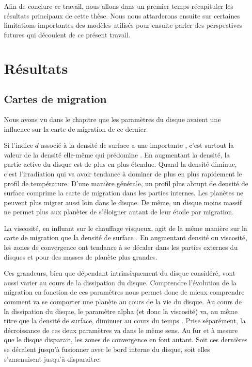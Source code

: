 Afin de conclure ce travail, nous allons dans un premier temps récapituler les résultats principaux de cette thèse. Nous nous attarderons ensuite sur certaines limitations importantes des modèles utilisés pour ensuite parler des perspectives futures qui découlent de ce présent travail. 

\section{Résultats}
\subsection{Cartes de migration}
Nous avons vu dans le chapitre  que les paramètres du disque avaient une influence sur la carte de migration de ce dernier. 

Si l'indice $d$ associé à la densité de surface a une importante , c'est surtout la valeur de la densité
elle-même qui prédomine . En augmentant la densité, la partie active du disque est de plus en plus étendue.
Quand la densité diminue, c'est l'irradiation qui va avoir tendance à dominer de plus en plus rapidement le profil de
température. D'une manière générale, un profil plus abrupt de densité de surface comprime la carte de migration dans les parties
internes. Les planètes ne peuvent plus migrer aussi loin dans le disque. De même, un disque moins massif ne permet plus aux
planètes de s'éloigner autant de leur étoile par migration. 

La viscosité, en influant sur le chauffage visqueux, agit de la même manière sur la carte de migration que la densité de surface
. En augmentant densité ou viscosité, les zones de convergence ont tendance à se décaler dans les
parties externes du disques et pour des masses de planète plus grandes. 

Ces grandeurs, bien que dépendant intrinsèquement du disque considéré, vont aussi varier au cours de la dissipation du disque.
Comprendre l'évolution de la migration en fonction de ces paramètres nous permet donc de mieux comprendre comment va se
comporter une planète au cours de la vie du disque. Au cours de la dissipation du disque, le paramètre alpha (et donc la
viscosité) va, au même titre que la densité de surface, diminuer au cours du temps \citep[Fig. 16]{guilloteau2011dual}. Prise
séparément, la décroissance de ces deux paramètres va dans le même sens. Au fur et à mesure que le disque disparait, les zones
de convergence en font autant. Soit ces dernières se décalent jusqu'à fusionner avec le bord interne du disque, soit elles
s'amenuisent jusqu'à disparaitre.

